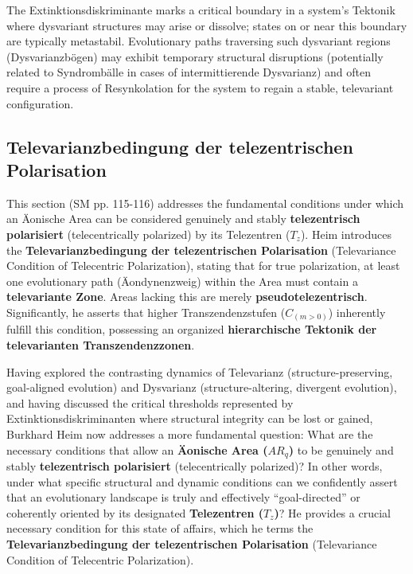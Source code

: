 \documentclass[12pt]{article}
\newcommand{\q}[1]{\enquote{#1}}
\newcommand{\telezentrum}{T_z}
\newcommand{\aeonischearea}{AR_q}
\begin{document}
The Extinktionsdiskriminante marks a critical boundary in a system's Tektonik where dysvariant structures may arise or dissolve; states on or near this boundary are typically metastabil. Evolutionary paths traversing such dysvariant regions (Dysvarianzbögen) may exhibit temporary structural disruptions (potentially related to Syndrombälle in cases of intermittierende Dysvarianz) and often require a process of Resynkolation for the system to regain a stable, televariant configuration.

\subsection{Televarianzbedingung der telezentrischen Polarisation}
\label{sec:televarianzbedingung}

This section (SM pp. 115-116) addresses the fundamental conditions under which an Äonische Area can be considered genuinely and stably \textbf{telezentrisch polarisiert} (telecentrically polarized) by its Telezentren (\(\telezentrum\)). Heim introduces the \textbf{Televarianzbedingung der telezentrischen Polarisation} (Televariance Condition of Telecentric Polarization), stating that for true polarization, at least one evolutionary path (Äondynenzweig) within the Area must contain a \textbf{televariante Zone}. Areas lacking this are merely \textbf{pseudotelezentrisch}. Significantly, he asserts that higher Transzendenzstufen (\(C_{(m>0)}\)) inherently fulfill this condition, possessing an organized \textbf{hierarchische Tektonik der televarianten Transzendenzzonen}.

Having explored the contrasting dynamics of Televarianz (structure-preserving, goal-aligned evolution) and Dysvarianz (structure-altering, divergent evolution), and having discussed the critical thresholds represented by Extinktionsdiskriminanten where structural integrity can be lost or gained, Burkhard Heim now addresses a more fundamental question: What are the necessary conditions that allow an \textbf{Äonische Area (\(\aeonischearea\))} to be genuinely and stably \textbf{telezentrisch polarisiert} (telecentrically polarized)? In other words, under what specific structural and dynamic conditions can we confidently assert that an evolutionary landscape is truly and effectively \q{goal-directed} or coherently oriented by its designated \textbf{Telezentren (\( \telezentrum \))}? He provides a crucial necessary condition for this state of affairs, which he terms the \textbf{Televarianzbedingung der telezentrischen Polarisation} (Televariance Condition of Telecentric Polarization).
\end{document}
